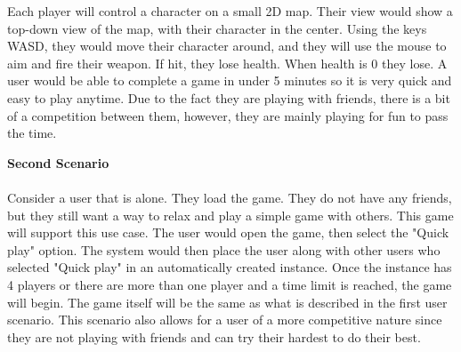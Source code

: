 \documentclass[11pt, oneside]{article}   	%
\begin{document}
Each player will control a character on a small 2D map.  Their view would show
a top-down view of the map, with their character in the center. Using the keys
WASD, they would move their character around, and they will use the mouse
to aim and fire their weapon. If hit, they lose health. When health is 0 they
lose. A user would be able to complete a game in under 5 minutes so it is very
quick and easy to play anytime. Due to the fact they are playing with friends,
there is a bit of a competition between them, however, they are mainly playing
for fun to pass the time. 

\clearpage

\noindent\textbf{Second Scenario}\\\\

Consider a user that is alone. They load the game. They do not have any
friends, but they still want a way to relax and play a simple game with others.
This game will support this use case. The user would open the game, then select
the "Quick play" option.  The system would then place the user along with other
users who selected "Quick play" in an automatically created instance.  Once the
instance has 4 players or there are more than one player and a time limit is
reached, the game will begin.  The game itself will be the same as what is
described in the first user scenario.  This scenario also allows for a user of
a more competitive nature since they are not playing with friends and can try
their hardest to do their best.
\end{document}
